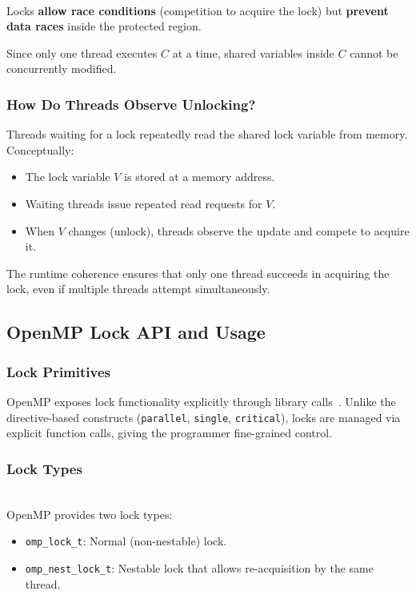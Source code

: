 \begin{ppkey}
\\ Locks \textbf{allow race conditions} (competition to acquire the lock) but \textbf{prevent data races} inside the protected region.

Since only one thread executes $C$ at a time, shared variables inside $C$ cannot be concurrently modified.
\end{ppkey}

\subsubsection{How Do Threads Observe Unlocking?}

Threads waiting for a lock repeatedly read the shared lock variable from memory. Conceptually:
\begin{itemize}
    \item The lock variable $V$ is stored at a memory address.
    \item Waiting threads issue repeated read requests for $V$.
    \item When $V$ changes (unlock), threads observe the update and compete to acquire it.
\end{itemize}

The runtime coherence ensures that only one thread succeeds in acquiring the lock, even if multiple threads attempt simultaneously.

\subsection{OpenMP Lock API and Usage}
\label{sec:lock-primitives}

\subsubsection{Lock Primitives}

OpenMP exposes lock functionality explicitly through library calls~\cite{openmp-spec}. Unlike the directive-based constructs (\texttt{parallel}, \texttt{single}, \texttt{critical}), locks are managed via explicit function calls, giving the programmer fine-grained control.

\subsubsection{Lock Types}

\begin{ppnote}
\\ OpenMP provides two lock types:
\begin{itemize}
    \item \texttt{omp\_lock\_t}: Normal (non-nestable) lock.
    \item \texttt{omp\_nest\_lock\_t}: Nestable lock that allows re-acquisition by the same thread.
\end{itemize}
\end{ppnote}

